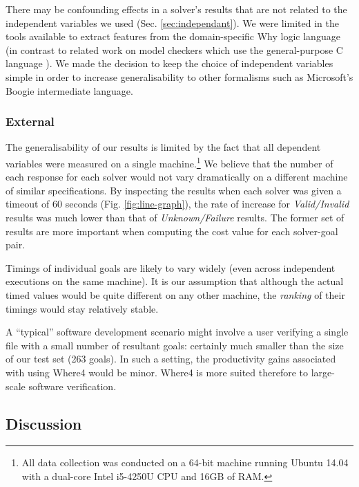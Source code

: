 \documentclass[submission,copyright,creativecommons]{eptcs}
\begin{document}
There may be confounding effects in a solver's results that are not related to the independent variables we used (Sec. \ref{sec:independant}). We were limited in the tools available to extract features from the domain-specific Why logic language (in contrast to related work on model checkers which use the general-purpose C language \cite{DPVZ15:CAV}\cite{MUX}). We made the decision to keep the choice of independent variables simple in order to increase generalisability to other formalisms such as Microsoft's Boogie \cite{Boogie} intermediate language.  

\subsubsection{External}

The generalisability of our results is limited by the fact that all dependent variables were measured on a single machine.\footnote{All data collection was conducted on a 64-bit machine running Ubuntu 14.04 with a dual-core Intel i5-4250U CPU and 16GB of RAM.} We believe that the number of each response for each solver would not vary dramatically on a different machine of similar specifications. By inspecting the results when each solver was given a timeout of 60 seconds (Fig. \ref{fig:line-graph}), the rate of increase for \textit{Valid/Invalid} results was much lower than that of \textit{Unknown/Failure} results. The former set of results are more important when computing the cost value for each solver-goal pair.

Timings of individual goals are likely to vary widely (even across independent executions on the same machine).
It is our assumption that although the actual timed values would be quite different on any other machine, the \textit{ranking} of their timings would stay relatively stable.

A ``typical'' software development scenario might involve a user verifying a single file with a small number of resultant goals: certainly much smaller than the size of our test set (263 goals). In such a setting, the productivity gains associated with using \textsf{Where4} would be minor. \textsf{Where4} is more suited therefore to large-scale software verification.


\subsection{Discussion}
\label{sec:eval-discuss}
\end{document}
